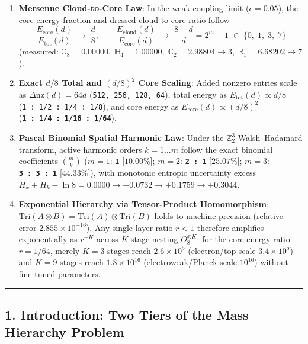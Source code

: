 \documentclass[
  a4paper,
]{article}
\providecommand{\tightlist}{%
  \setlength{\itemsep}{0pt}\setlength{\parskip}{0pt}}
\begin{document}
\begin{enumerate}
\def\labelenumi{\arabic{enumi}.}
\tightlist
\item
  \textbf{Mersenne Cloud-to-Core Law}: In the weak-coupling limit
  (\(\epsilon = 0.05\)), the core energy fraction and dressed
  cloud-to-core ratio follow
  \[\frac{E_{\mathrm{core}}(d)}{E_{\mathrm{tot}}(d)} \;\longrightarrow\; \frac{d}{8}, \qquad \frac{E_{\mathrm{cloud}}(d)}{E_{\mathrm{core}}(d)} \;\longrightarrow\; \frac{8 - d}{d} = 2^m - 1 \;\in\; \{0,\; 1,\; 3,\; 7\}\]
  (measured:
  \(\mathbb{O}_8 = 0.00000,\; \mathbb{H}_4 = 1.00000,\; \mathbb{C}_2 = 2.98804 \to 3,\; \mathbb{R}_1 = 6.68202 \to 7\)).
\item
  \textbf{Exact \(d/8\) Total and \((d/8)^2\) Core Scaling}: Added
  nonzero entries scale as \(\Delta\mathrm{nz}(d) = 64d\)
  (\texttt{512,\ 256,\ 128,\ 64}), total energy as
  \(E_{\mathrm{tot}}(d) \propto d/8\)
  (\texttt{1\ :\ 1/2\ :\ 1/4\ :\ 1/8}), and core energy as
  \(E_{\mathrm{core}}(d) \propto (d/8)^2\)
  (\textbf{\texttt{1\ :\ 1/4\ :\ 1/16\ :\ 1/64}}).
\item
  \textbf{Pascal Binomial Spatial Harmonic Law}: Under the
  \(\mathbb{Z}_2^3\) Walsh--Hadamard transform, active harmonic orders
  \(k = 1 \dots m\) follow the exact binomial coefficients
  \(\binom{m}{k}\) (\(m=1\): \texttt{1} {[}\(10.00\%\){]}; \(m=2\):
  \textbf{\texttt{2\ :\ 1}} {[}\(25.07\%\){]}; \(m=3\):
  \textbf{\texttt{3\ :\ 3\ :\ 1}} {[}\(44.33\%\){]}), with monotonic
  entropic uncertainty excess
  \(H_x + H_k - \ln 8 = 0.0000 \to +0.0732 \to +0.1759 \to +0.3044\).
\item
  \textbf{Exponential Hierarchy via Tensor-Product Homomorphism}:
  \(\mathrm{Tri}(A \otimes B) = \mathrm{Tri}(A) \otimes \mathrm{Tri}(B)\)
  holds to machine precision (relative error
  \textbf{\(2.855 \times 10^{-16}\)}). Any single-layer ratio \(r < 1\)
  therefore amplifies exponentially as \(r^{-K}\) across \(K\)-stage
  nesting \(O_8^{\otimes K}\): for the core-energy ratio \(r = 1/64\),
  merely \(K = 3\) stages reach \(2.6 \times 10^5\) (electron/top scale
  \(3.4 \times 10^5\)) and \(K = 9\) stages reach \(1.8 \times 10^{16}\)
  (electroweak/Planck scale \(10^{16}\)) without fine-tuned parameters.
\end{enumerate}

\begin{center}\rule{0.5\linewidth}{0.5pt}\end{center}

\subsection{1. Introduction: Two Tiers of the Mass Hierarchy
Problem}\label{introduction-two-tiers-of-the-mass-hierarchy-problem}
\end{document}
